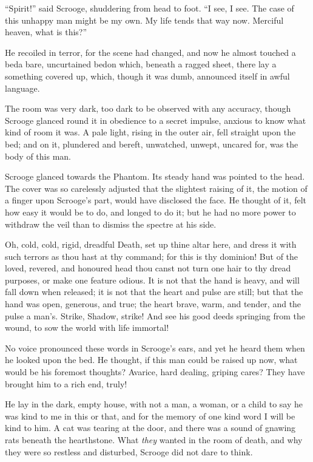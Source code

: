 \documentclass[paper=5.5in:8.5in,BCOR=10mm,twoside,DIV=15,12pt,usegeometry,openany]{scrbook} %
\begin{document}
\enquote{Spirit!} said Scrooge, shuddering from head to foot. \enquote{I see, I see. The case of this unhappy man might be my own. My life tends that way now. Merciful heaven, what is this?}

He recoiled in terror, for the scene had changed, and now he almost touched a bed\textemdash a bare, uncurtained bed\textemdash on which, beneath a ragged sheet, there lay a something covered up, which, though it was dumb, announced itself in awful language.

The room was very dark, too dark to be observed with any accuracy, though Scrooge glanced round it in obedience to a secret impulse, anxious to know what kind of room it was. A pale light, rising in the outer air, fell straight upon the bed; and on it, plundered and bereft, unwatched, unwept, uncared for, was the body of this man.

Scrooge glanced towards the Phantom. Its steady hand was pointed to the head. The cover was so carelessly adjusted that the slightest raising of it, the motion of a finger upon Scrooge's part, would have disclosed the face. He thought of it, felt how easy it would be to do, and longed to do it; but he had no more power to withdraw the veil than to dismiss the spectre at his side.

Oh, cold, cold, rigid, dreadful Death, set up thine altar here, and dress it with such terrors as thou hast at thy command; for this is thy dominion! But of the loved, revered, and honoured head thou canst not turn one hair to thy dread purposes, or make one feature odious. It is not that the hand is heavy, and will fall down when released; it is not that the heart and pulse are still; but that the hand was open, generous, and true; the heart brave, warm, and tender, and the pulse a man's. Strike, Shadow, strike! And see his good deeds springing from the wound, to sow the world with life immortal!

No voice pronounced these words in Scrooge's ears, and yet he heard them when he looked upon the bed. He thought, if this man could be raised up now, what would be his foremost thoughts? Avarice, hard dealing, griping cares? They have brought him to a rich end, truly!

He lay in the dark, empty house, with not a man, a woman, or a child to say he was kind to me in this or that, and for the memory of one kind word I will be kind to him. A cat was tearing at the door, and there was a sound of gnawing rats beneath the hearthstone. What \textit{they} wanted in the room of death, and why they were so restless and disturbed, Scrooge did not dare to think.
\end{document}
